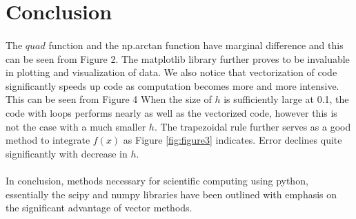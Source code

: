 \documentclass[a4paper, 12pt, margin= 1.25cm ]{article}
\begin{document}
	\section{Conclusion}

	\paragraph{} The $quad$ function and the np.arctan function have marginal difference and this can be seen from Figure 2. The matplotlib library further proves to be invaluable in plotting and visualization of data. We also notice that vectorization of code significantly speeds up code as computation becomes more and more intensive. This can be seen from Figure 4 When the size of $h$ is sufficiently large at 0.1, the code with loops performs nearly as well as the vectorized code, however this is not the case with a much smaller $h$. The trapezoidal rule further serves as a good method to integrate $f(x)$ as Figure \ref{fig:figure3} indicates. Error declines quite significantly with decrease in $h$.

	\paragraph{} In conclusion, methods necessary for scientific computing using python, essentially the scipy and numpy libraries have been outlined with emphasis on the significant advantage of vector methods.
\end{document}
